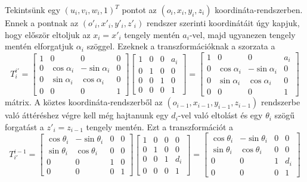 \documentclass[12pt,a4paper]{report}
\theoremstyle{remark}
\theoremstyle{definition}
\begin{document}
Tekintsünk egy $(u_i, v_i, w_i, 1)^T$ pontot az $(o_i, x_i, y_i, z_i)$ koordináta-rendszerben. Ennek a pontnak az 
$(o'_i, x'_i, y'_i, z'_i)$ rendszer szerinti koordinátáit úgy kapjuk, hogy először eltoljuk az $x_i = x'_i$ tengely 
mentén $a_i$-vel, majd ugyanezen tengely mentén elforgatjuk $\alpha_i$ szöggel. Ezeknek a transzformációknak a 
szorzata a
\begin{equation}
T^{i'}_{i} =
\begin{bmatrix}
1 & 0 & 0 & 0 \\ 
0 & \cos \alpha_i & -\sin \alpha_i & 0 \\ 
0 & \sin \alpha_i & \cos \alpha_i & 0 \\ 
0 & 0 & 0 & 1
\end{bmatrix} 
\begin{bmatrix}
1 & 0 & 0 & a_i \\ 
0 & 1 & 0 & 0 \\ 
0 & 0 & 1 & 0 \\ 
0 & 0 & 0 & 1
\end{bmatrix} =
\begin{bmatrix}
1 & 0 & 0 & a_i \\ 
0 & \cos \alpha_i & -\sin \alpha_i & 0 \\ 
0 & \sin \alpha_i & \cos \alpha_i & 0 \\ 
0 & 0 & 0 & 1
\end{bmatrix} 
\end{equation}
mátrix. A köztes koordináta-rendszerből az $(o_{i-1}, x_{i-1}, y_{i-1}, z_{i-1})$ rendszerbe való áttéréshez végre 
kell még hajtanunk egy $d_i$-vel való eltolást és egy $\theta_i$ szögű forgatást a $z'_i = z_{i-1}$ tengely mentén. 
Ezt a transzformációt a
\begin{equation}
T^{i-1}_{i'} =
\begin{bmatrix}
\cos \theta_i & -\sin \theta_i & 0 & 0 \\ 
\sin \theta_i & \cos \theta_i & 0 & 0 \\ 
0 & 0 & 1 & 0 \\ 
0 & 0 & 0 & 1
\end{bmatrix} 
\begin{bmatrix}
1 & 0 & 0 & 0 \\ 
0 & 1 & 0 & 0 \\ 
0 & 0 & 1 & d_i \\ 
0 & 0 & 0 & 1
\end{bmatrix} =
\begin{bmatrix}
\cos \theta_i & -\sin \theta_i & 0 & 0 \\ 
\sin \theta_i & \cos \theta_i & 0 & 0 \\ 
0 & 0 & 1 & d_i \\ 
0 & 0 & 0 & 1
\end{bmatrix} 
\end{equation}
\end{document}
